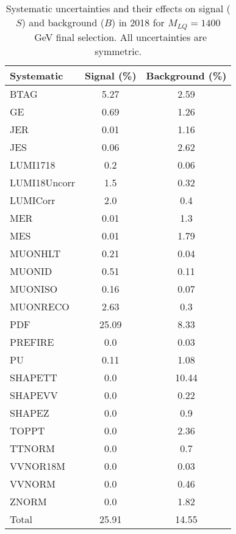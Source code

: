 \begin{table}[htbp]
\begin{center}
\caption{Systematic uncertainties and their effects on signal ($S$) and background ($B$) in 2018 for $M_{LQ}=1400$~GeV final selection. All uncertainties are symmetric.}
\begin{tabular}{lcc}
\hline\hline
Systematic & Signal (\%) & Background (\%) \\ \hline 
BTAG & 5.27 & 2.59\\ 
GE & 0.69 & 1.26\\ 
JER & 0.01 & 1.16\\ 
JES & 0.06 & 2.62\\ 
LUMI1718 & 0.2 & 0.06\\ 
LUMI18Uncorr & 1.5 & 0.32\\ 
LUMICorr & 2.0 & 0.4\\ 
MER & 0.01 & 1.3\\ 
MES & 0.01 & 1.79\\ 
MUONHLT & 0.21 & 0.04\\ 
MUONID & 0.51 & 0.11\\ 
MUONISO & 0.16 & 0.07\\ 
MUONRECO & 2.63 & 0.3\\ 
PDF & 25.09 & 8.33\\ 
PREFIRE & 0.0 & 0.03\\ 
PU & 0.11 & 1.08\\ 
SHAPETT & 0.0 & 10.44\\ 
SHAPEVV & 0.0 & 0.22\\ 
SHAPEZ & 0.0 & 0.9\\ 
TOPPT & 0.0 & 2.36\\ 
TTNORM & 0.0 & 0.7\\ 
VVNOR18M & 0.0 & 0.03\\ 
VVNORM & 0.0 & 0.46\\ 
ZNORM & 0.0 & 1.82\\ 
Total & 25.91 & 14.55\\ \hline \hline
\end{tabular}
\label{tab:SysUncertainties_uujj_1400}
\end{center}
\end{table}

